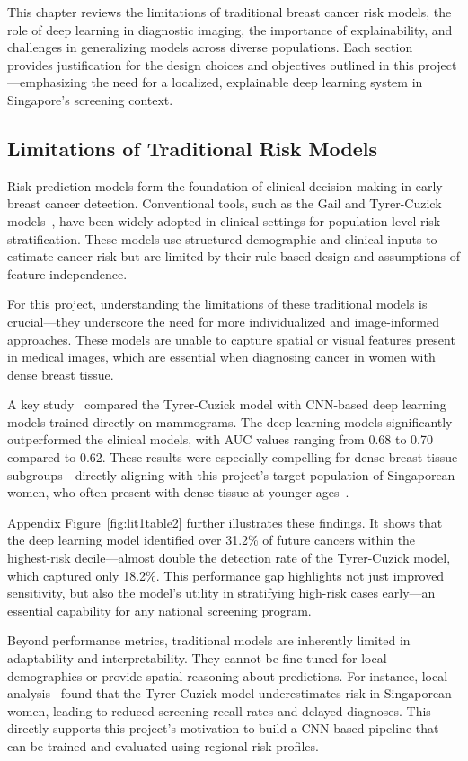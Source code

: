 \documentclass[12pt]{article}
\begin{document}
This chapter reviews the limitations of traditional breast cancer risk models, the role of deep learning in diagnostic imaging, the importance of explainability, and challenges in generalizing models across diverse populations. Each section provides justification for the design choices and objectives outlined in this project—emphasizing the need for a localized, explainable deep learning system in Singapore's screening context.

\subsection{Limitations of Traditional Risk Models}

Risk prediction models form the foundation of clinical decision-making in early breast cancer detection. Conventional tools, such as the Gail and Tyrer-Cuzick models~\cite{1}, have been widely adopted in clinical settings for population-level risk stratification. These models use structured demographic and clinical inputs to estimate cancer risk but are limited by their rule-based design and assumptions of feature independence.

For this project, understanding the limitations of these traditional models is crucial—they underscore the need for more individualized and image-informed approaches. These models are unable to capture spatial or visual features present in medical images, which are essential when diagnosing cancer in women with dense breast tissue.

A key study~\cite{1} compared the Tyrer-Cuzick model with CNN-based deep learning models trained directly on mammograms. The deep learning models significantly outperformed the clinical models, with AUC values ranging from 0.68 to 0.70 compared to 0.62. These results were especially compelling for dense breast tissue subgroups—directly aligning with this project’s target population of Singaporean women, who often present with dense tissue at younger ages~\cite{6}.

Appendix Figure~\ref{fig:lit1table2} further illustrates these findings. It shows that the deep learning model identified over 31.2\% of future cancers within the highest-risk decile—almost double the detection rate of the Tyrer-Cuzick model, which captured only 18.2\%. This performance gap highlights not just improved sensitivity, but also the model’s utility in stratifying high-risk cases early—an essential capability for any national screening program.

Beyond performance metrics, traditional models are inherently limited in adaptability and interpretability. They cannot be fine-tuned for local demographics or provide spatial reasoning about predictions. For instance, local analysis~\cite{6} found that the Tyrer-Cuzick model underestimates risk in Singaporean women, leading to reduced screening recall rates and delayed diagnoses. This directly supports this project’s motivation to build a CNN-based pipeline that can be trained and evaluated using regional risk profiles.
\end{document}
